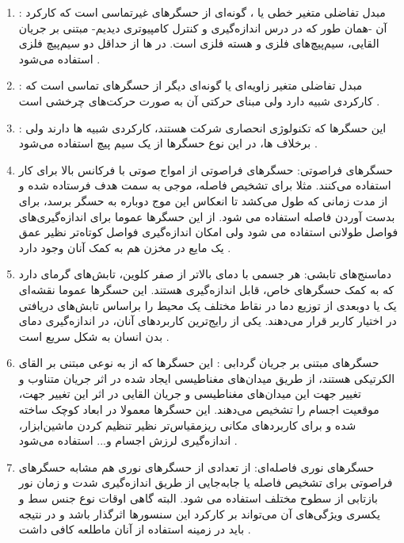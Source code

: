 \begin{enumerate}
	\item {}: مبدل تفاضلی متغیر خطی یا ، گونه‌ای از حسگر‌های غیرتماسی است  که  کارکرد آن -همان طور که در درس اندازه‌گیری و کنترل کامپیوتری دیدیم- مبتنی بر جریان القایی، سیم‌پیچ‌های فلزی و هسته فلزی است. در  ها از حداقل دو سیم‌پیچ فلزی استفاده می‌شود 
	\cite{varriohm_2020}.
	
	\item {}: مبدل تفاضلی متغیر زاویه‌ای یا  گونه‌ای دیگر از حسگر‌های تماسی است که کارکردی شبیه  دارد ولی مبنای حرکتی آن به صورت حرکت‌های چرخشی است
	\cite{varriohm_2020}.
	
	\item
	:
	این حسگر‌ها که تکنولوژی انحصاری شرکت  هستند، کارکردی شبیه  ها دارند ولی برخلاف  ها، در این نوع حسگر‌ها از یک سیم پیچ استفاده می‌شود
	\cite{varriohm_2020}.
	
	\item
	حسگرهای فراصوتی: حسگرهای فراصوتی
	از امواج صوتی با فرکانس بالا برای کار استفاده می‌کنند. مثلا برای تشخیص فاصله، موجی به سمت هدف فرستاده شده و از مدت زمانی که طول می‌کشد تا انعکاس این موج دوباره به حسگر برسد، برای بدست آوردن فاصله استفاده می شود. از این حسگر‌ها عموما برای اندازه‌گیری‌های فواصل طولانی استفاده می شود ولی امکان اندازه‌گیری فواصل کوتاه‌تر نظیر عمق یک مایع در مخزن هم به کمک آنان وجود دارد \cite{edwards_2017}.
	
	\item دماسنج‌های تابشی:
	هر جسمی با دمای بالاتر از صفر کلوین، تابش‌های گرمای دارد که به کمک حسگر‌های خاص، قابل اندازه‌گیری هستند. این حسگر‌ها عموما نقشه‌ای یک یا دوبعدی از توزیع دما در نقاط مختلف یک محیط را براساس تابش‌های دریافتی در اختیار کاربر قرار می‌دهند. یکی از رایج‌ترین کاربردهای آنان، در اندازه‌گیری دمای بدن انسان به شکل سریع است \cite{edwards_2017}.
	\item حسگر‌های مبتنی بر جریان گردابی
	:
	این حسگر‌ها که از به نوعی مبتنی بر القای الکرتیکی هستند، از طریق میدان‌های مغناطیسی ایجاد شده در اثر جریان متناوب و تغییر جهت این میدان‌های مغناطیسی و جریان القایی در اثر این تغییر جهت، موقعیت اجسام را تشخیص می‌دهند. این حسگر‌ها معمولا در ابعاد کوچک ساخته شده و برای کاربرد‌های مکانی ریزمقیاس‌تر نظیر تنظیم کردن ماشین‌ابزار، اندازه‌گیری لرزش اجسام و... استفاده می‌شود	\cite{ixthus_instrumentation_what_nodate}.
	
	\item 
	حسگر‌های نوری فاصله‌ای: از تعدادی از حسگر‌های نوری هم مشابه حسگرهای فراصوتی برای تشخیص فاصله یا جابه‌جایی از طریق اندازه‌گیری شدت و زمان نور بازتابی از سطوح مختلف استفاده می شود. البته گاهی اوقات نوع جنس سط و یکسری ویژگی‌های آن می‌تواند بر کارکرد این سنسورها اثرگذار باشد و در نتیجه باید در زمینه استفاده از آنان ماطلعه کافی داشت
	\cite{edwards_2017}.
	

\end{enumerate}
